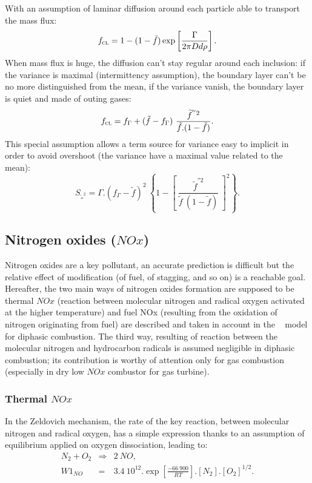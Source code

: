 With an assumption of laminar diffusion around each particle able to transport
the mass flux:
\begin{equation*}
\displaystyle f_{\mbox{\scriptsize\textsc{cl}}} =  1 - (1-\tilde f)\exp \left[\displaystyle \frac{\Gamma}{2 \pi D d \rho}\right].
\end{equation*} 
When mass flux is huge, the diffusion can't stay regular around each inclusion:
if the variance is maximal (intermittency assumption), the boundary layer can't
be no more distinguished from the mean, if the variance vanish, the boundary
layer is quiet and made of outing gases:
\begin{equation*}
\displaystyle f_{\mbox{\scriptsize\textsc{cl}}} = f_{\Gamma} + (\tilde f  - f_{\Gamma}) ~ \frac{\widetilde f^{''2}}{\tilde f .(1-\tilde f)}.
\end{equation*} 
This special assumption allows a term source for variance easy to implicit in order to avoid overshoot (the variance have a maximal value related to the mean):
\begin{equation*}
\displaystyle S_{\widetilde ''^{2}} = \Gamma .\left( f_{\Gamma}-\tilde f\right)^{2} ~ \left\{ 1-\left[~ \frac{\widetilde f^{''2}}{\tilde f ~(1-\tilde f)}~\right]^{\textstyle2}\right\} .
\end{equation*}


\subsection{Nitrogen oxides ($NOx$)}

Nitrogen oxides are a key pollutant, an accurate prediction is difficult but the
relative effect of modification (of fuel, of stagging, and so on) is a reachable
goal.
Hereafter, the two main ways of nitrogen oxides formation are supposed to
be thermal $NOx$ (reaction between molecular nitrogen and radical oxygen activated
at the higher temperature) and fuel NOx (resulting from the oxidation of
nitrogen originating from fuel) are described and taken in account in the \CS~
model for diphasic combustion. The third way, resulting of reaction between the
molecular nitrogen and hydrocarbon radicals is assumed negligible in diphasic
combustion; its contribution is worthy of attention only for gas combustion
(especially in dry
low $NOx$ combustor for gas turbine).

\subsubsection{Thermal $NOx$}
In the Zeldovich mechanism, the rate of the key reaction, between molecular
nitrogen and radical oxygen, has a simple expression thanks to an assumption of
equilibrium applied on oxygen dissociation, leading to:
\begin{eqnarray*}
 N_{2} + O_{2} &\Rightarrow& 2 ~NO , \\
 W1_{NO}&=& 3.4\medspace10^{12}  .   \exp \left[\frac{-66\medspace900}{RT}\right].\left[ N_{2} \right] . \left[O_{2}\right]^{1/2} .
\end{eqnarray*} 
 
